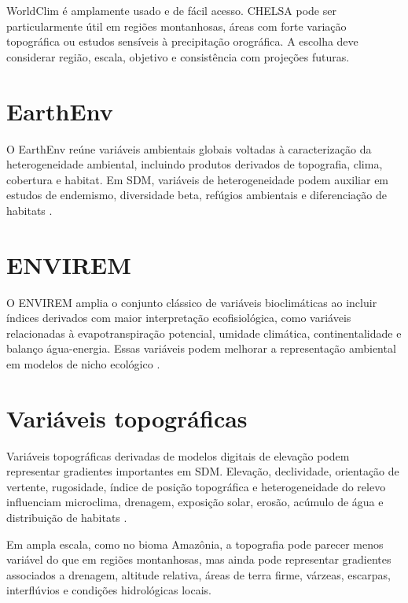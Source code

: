 \documentclass{ueap-sdm}
\begin{document}
\begin{dica}[title={\faLightbulb\quad WorldClim ou CHELSA?}]
	WorldClim é amplamente usado e de fácil acesso. CHELSA pode ser particularmente útil em regiões montanhosas, áreas com forte variação topográfica ou estudos sensíveis à precipitação orográfica. A escolha deve considerar região, escala, objetivo e consistência com projeções futuras.
\end{dica}

\section{EarthEnv}

O EarthEnv reúne variáveis ambientais globais voltadas à caracterização da heterogeneidade ambiental, incluindo produtos derivados de topografia, clima, cobertura e habitat. Em SDM, variáveis de heterogeneidade podem auxiliar em estudos de endemismo, diversidade beta, refúgios ambientais e diferenciação de habitats \parencite{amatulli2018data}.

\section{ENVIREM}

O ENVIREM amplia o conjunto clássico de variáveis bioclimáticas ao incluir índices derivados com maior interpretação ecofisiológica, como variáveis relacionadas à evapotranspiração potencial, umidade climática, continentalidade e balanço água-energia. Essas variáveis podem melhorar a representação ambiental em modelos de nicho ecológico \parencite{title2018envirem}.

\section{Variáveis topográficas}

Variáveis topográficas derivadas de modelos digitais de elevação podem representar gradientes importantes em SDM. Elevação, declividade, orientação de vertente, rugosidade, índice de posição topográfica e heterogeneidade do relevo influenciam microclima, drenagem, exposição solar, erosão, acúmulo de água e distribuição de habitats \parencite{farr2007srtm}.

Em ampla escala, como no bioma Amazônia, a topografia pode parecer menos variável do que em regiões montanhosas, mas ainda pode representar gradientes associados a drenagem, altitude relativa, áreas de terra firme, várzeas, escarpas, interflúvios e condições hidrológicas locais.
\end{document}
